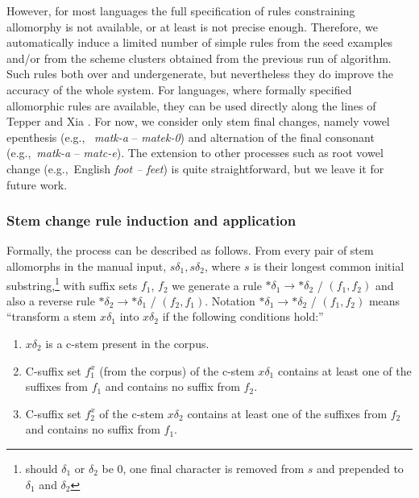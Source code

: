 \documentclass{itatnew}
\newcommand{\e}[1]{\textit{#1}} %
\newcommand{\eg}{e.g.,~}
\newcommand{\todoja}[1]{[\textbf{TODOJ} #1]}
\begin{document}

However, for most languages the full specification of rules constraining allomorphy is not available, or at least is not precise enough. Therefore, we automatically induce a limited number of simple rules from the seed examples and/or from the scheme clusters obtained from the previous run of algorithm. Such rules both over and undergenerate, but nevertheless they do improve the accuracy of the whole system. For languages, where formally specified allomorphic rules are available, they can be used directly along the lines of Tepper and Xia \cite{tepper10,tepper-xia-2008}.
%
For now, we consider only stem final changes, namely vowel epenthesis (\eg
\e{matk-a} -- \e{matek-0}) and alternation of the final consonant (\eg \e{matk-a} -- \e{matc-e}). The extension to other processes such as root vowel change (\eg English \e{foot -- feet}) is quite straightforward, but we leave it for future work.



\subsubsection{Stem change rule induction and application}
\label{sec:ruleinduction}
\noindent
Formally, the process can be described as follows.
From every pair of stem allomorphs in the manual input, $s\delta_1, s\delta_2$, where $s$ is their longest common initial substring,\footnote{should $\delta_1$ or $\delta_2$ be 0, one final character is removed from $s$ and prepended to $\delta_1$ and $\delta_2$} with suffix
sets $f_1$, $f_2$ we generate a rule $*\delta_1 \rightarrow *\delta_2$ / $(f_1, f_2)$ and also a reverse rule $*\delta_2 \rightarrow *\delta_1$ / $(f_2, f_1)$. Notation $*\delta_1 \rightarrow *\delta_2$ / $(f_1, f_2)$ means ``transform a stem $x\delta_1$ into $x\delta_2$ if the following conditions hold:''

\begin{enumerate}
\item $x\delta_2$ is a c-stem present in the corpus.
\item C-suffix set $f^x_1$ (from the corpus) of the c-stem $x\delta_1$ contains at least one of the suffixes from $f_1$ and contains no suffix from $f_2$.
\item C-suffix set $f^x_2$ of the c-stem $x\delta_2$ contains at least one of the suffixes from $f_2$ and contains no suffix from $f_1$.
\end{enumerate}
\end{document}
